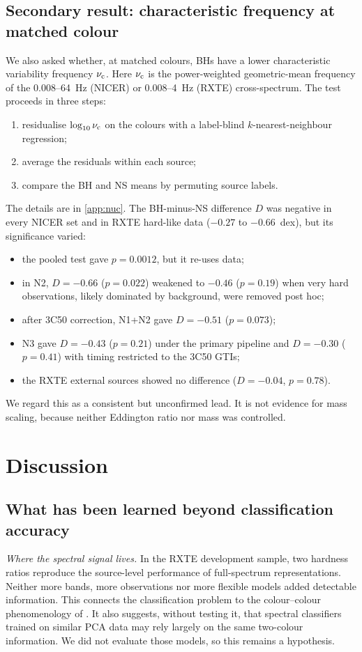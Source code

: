 \documentclass[11pt,a4paper]{article}
\newcommand{\nuc}{\nu_{\rm c}}
\begin{document}
\subsection{Secondary result: characteristic frequency at matched colour}\label{sec:nuc}
We also asked whether, at matched colours, BHs have a lower characteristic variability frequency $\nuc$. Here $\nuc$ is
the power-weighted geometric-mean frequency of the 0.008--64~Hz (NICER) or 0.008--4~Hz (RXTE) cross-spectrum. The test
proceeds in three steps:
\begin{enumerate}\setlength\itemsep{1pt}
\item residualise $\log_{10}\nuc$ on the colours with a label-blind $k$-nearest-neighbour regression;
\item average the residuals within each source;
\item compare the BH and NS means by permuting source labels.
\end{enumerate}
The details are in \cref{app:nuc}. The BH-minus-NS difference $D$ was negative in every NICER set and in RXTE hard-like
data ($-0.27$ to $-0.66$~dex), but its significance varied:
\begin{itemize}\setlength\itemsep{1pt}
\item the pooled test gave $p=0.0012$, but it re-uses data;
\item in N2, $D=-0.66$ ($p=0.022$) weakened to $-0.46$ ($p=0.19$) when very hard observations, likely dominated by
background, were removed post hoc;
\item after 3C50 correction, N1+N2 gave $D=-0.51$ ($p=0.073$);
\item N3 gave $D=-0.43$ ($p=0.21$) under the primary pipeline and $D=-0.30$ ($p=0.41$) with timing restricted to the
3C50 GTIs;
\item the RXTE external sources showed no difference ($D=-0.04$, $p=0.78$).
\end{itemize}
We regard this as a consistent but unconfirmed lead. It is not evidence for mass scaling, because neither Eddington ratio
nor mass was controlled.

\section{Discussion}\label{sec:discussion}

\subsection{What has been learned beyond classification accuracy}\label{sec:learned}
\emph{Where the spectral signal lives.} In the RXTE development sample, two hardness ratios reproduce the source-level
performance of full-spectrum representations. Neither more bands, more observations nor more flexible models added
detectable information. This connects the classification problem to the colour--colour phenomenology of
\citet{DoneGierlinski2003}. It also suggests, without testing it, that spectral classifiers trained on similar PCA data
\citep{Pattnaik2021} may rely largely on the same two-colour information. We did not evaluate those models, so this
remains a hypothesis.
\end{document}
